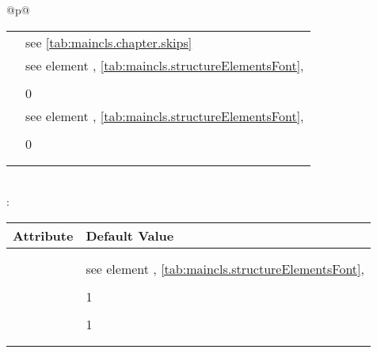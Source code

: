 \begin{longtable}{@{}p{\columnwidth}@{}}
\begin{tabularx}{\linewidth}{ll}
    \PValue{beforeskip}  & see \autoref{tab:maincls.chapter.skips} \\
    \PValue{font}        & see element \DescRef{maincls.fontelement.chapter},
                           \autoref{tab:maincls.structureElementsFont}, 
                           \autopageref{tab:maincls.structureElementsFont} \\
    \PValue{innerskip}   & \PValue{0pt} \\
    \PValue{level}       & 0 \\
    \PValue{prefixfont}  & see element 
                           \DescRef{maincls.fontelement.chapterprefix},
                           \autoref{tab:maincls.structureElementsFont}, 
                           \autopageref{tab:maincls.structureElementsFont} \\
    \PValue{tocindent}   & \PValue{0pt} \\
    \PValue{toclevel}    & 0 \\
    \PValue{tocnumwidth} & \PValue{1.5em} \\
    \PValue{tocstyle}    & \PValue{chapter} \\
    \bottomrule
    \end{tabularx} \\
    \addlinespace[\normalbaselineskip]
    : \\*
    \begin{tabularx}{\linewidth}{ll}
    \toprule
    Attribute & Default Value \\
    \midrule
    \PValue{afterskip}   & \PValue{2.3ex plus .2ex} \\
    \PValue{beforeskip}  & \PValue{-3.5ex plus -1ex minus -.2ex} \\
    \PValue{font}        & see element \DescRef{maincls.fontelement.section},
                           \autoref{tab:maincls.structureElementsFont}, 
                           \autopageref{tab:maincls.structureElementsFont} \\
    \PValue{indent}      & \PValue{0pt} \\
    \PValue{level}       & 1 \\
    \PValue{tocindent}   & \PValue{1.5em}\\
    \PValue{toclevel}    & 1 \\
    \PValue{tocnumwidth} & \PValue{2.3em}\\
    \PValue{tocstyle}    & \PValue{section} \\
    \bottomrule
    \end{tabularx} \\

\end{longtable}
